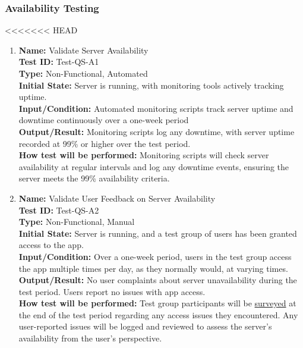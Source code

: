 \documentclass[12pt, titlepage]{article}
\begin{document}
\begin{enumerate}
\begin{enumerate}
\end{enumerate}
\subsubsection{Availability Testing}

<<<<<<< HEAD
\begin{enumerate}
    
\item \textbf{Name:} Validate Server Availability \label{itm:Test-QS-A1} \\
    \textbf{Test ID:} Test-QS-A1 \\
    \textbf{Type:} Non-Functional, Automated \\
    \textbf{Initial State:} Server is running, with monitoring tools actively tracking uptime. \\
    \textbf{Input/Condition:} Automated monitoring scripts track server uptime and downtime continuously over a one-week period \\
    \textbf{Output/Result:} Monitoring scripts log any downtime, with server uptime recorded at 99\% or higher over the test period. \\
    \textbf{How test will be performed:} Monitoring scripts will check server availability at regular intervals and log any downtime events, ensuring the server meets the 99\% availability criteria.


\item \textbf{Name:} Validate User Feedback on Server Availability \label{itm:Test-QS-A2} \\
    \textbf{Test ID:} Test-QS-A2 \\
    \textbf{Type:} Non-Functional, Manual \\
    \textbf{Initial State:} Server is running, and a test group of users has been granted access to the app. \\
    \textbf{Input/Condition:} Over a one-week period, users in the test group access the app multiple times per day, as they normally would, at varying times. \\
    \textbf{Output/Result:} No user complaints about server unavailability during the test period. Users report no issues with app access. \\
    \textbf{How test will be performed:} Test group participants will be \hyperref[sub:usability_survey]{surveyed} at the end of the test period regarding any access issues they encountered. Any user-reported issues will be logged and reviewed to assess the server's availability from the user’s perspective.


\end{enumerate}
\end{enumerate}
\end{document}

